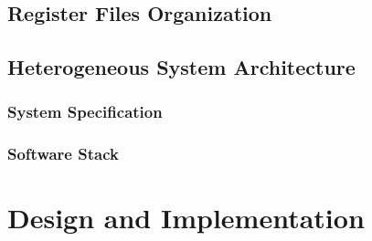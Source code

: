 \documentclass[12pt]{article}
\begin{document}
\begin{CJK}{UTF8}{bkai}

    \subsection{Register Files Organization}
    \subsection{Heterogeneous System Architecture}
        \subsubsection{System Specification}
        \subsubsection{Software Stack}

\section{Design and Implementation}

\end{CJK}
\end{document}
